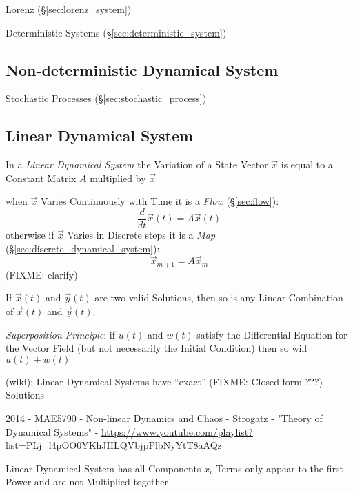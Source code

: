 Lorenz (\S\ref{sec:lorenz_system})

\fist Deterministic Systems (\S\ref{sec:deterministic_system})



\subsection{Non-deterministic Dynamical System}
\label{sec:nondeterministic_dynamical_system}

\fist Stochastic Processes (\S\ref{sec:stochastic_process})



\subsection{Linear Dynamical System}\label{sec:linear_dynamical_system}

In a \emph{Linear Dynamical System} the Variation of a State Vector $\vec{x}$
is equal to a Constant Matrix $A$ multiplied by $\vec{x}$

when $\vec{x}$ Varies Continuously with Time it is a \emph{Flow}
(\S\ref{sec:flow}):
\[
  \frac{d}{dt}\vec{x}(t) = A\vec{x}(t)
\]
otherwise if $\vec{x}$ Varies in Discrete steps it is a \emph{Map}
(\S\ref{sec:discrete_dynamical_system}):
\[
  \vec{x}_{m+1} = A\vec{x}_m
\]
(FIXME: clarify)

If $\vec{x}(t)$ and $\vec{y}(t)$ are two valid Solutions, then so is any Linear
Combination of $\vec{x}(t)$ and $\vec{y}(t)$.

\emph{Superposition Principle}: if $u(t)$ and $w(t)$ satisfy the Differential
Equation for the Vector Field (but not necessarily the Initial Condition) then
so will $u(t) + w(t)$

(wiki): Linear Dynamical Systems have ``exact'' (FIXME: Closed-form ???)
Solutions

\asterism

2014 - MAE5790 - Non-linear Dynamics and Chaos - Strogatz - "Theory of
Dynamical Systems" -
\url{https://www.youtube.com/playlist?list=PLj_l4pOO0YKhJHLQVbjpPlbNyYtT8aAQz}

Linear Dynamical System has all Components $x_i$ Terms only appear to the first
Power and are not Multiplied together

